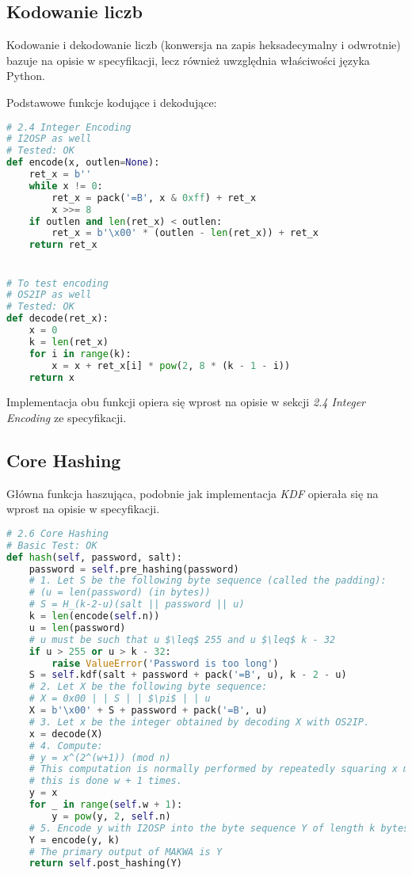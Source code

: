 \documentclass[a4paper,titleauthor]{mwart}
\begin{document}
\subsection{Kodowanie liczb}
Kodowanie i dekodowanie liczb (konwersja na zapis heksadecymalny i odwrotnie) bazuje na opisie w specyfikacji, lecz również uwzględnia właściwości języka Python.

Podstawowe funkcje kodujące i dekodujące:
\begin{lstlisting}[language=Python]
# 2.4 Integer Encoding
# I2OSP as well
# Tested: OK
def encode(x, outlen=None):
	ret_x = b''
	while x != 0:
		ret_x = pack('=B', x & 0xff) + ret_x
		x >>= 8
	if outlen and len(ret_x) < outlen:
		ret_x = b'\x00' * (outlen - len(ret_x)) + ret_x
	return ret_x


# To test encoding
# OS2IP as well
# Tested: OK
def decode(ret_x):
	x = 0
	k = len(ret_x)
	for i in range(k):
		x = x + ret_x[i] * pow(2, 8 * (k - 1 - i))
	return x
\end{lstlisting}
Implementacja obu funkcji opiera się wprost na opisie w sekcji \textit{2.4 Integer Encoding} ze specyfikacji.
\subsection{Core Hashing}
Główna funkcja haszująca, podobnie jak implementacja \textit{KDF} opierała się na wprost na opisie w specyfikacji.
\begin{lstlisting}[language=Python,mathescape]
# 2.6 Core Hashing
# Basic Test: OK
def hash(self, password, salt):
	password = self.pre_hashing(password)
	# 1. Let S be the following byte sequence (called the padding):
	# (u = len(password) (in bytes))
	# S = H_(k-2-u)(salt || password || u)
	k = len(encode(self.n))
	u = len(password)
	# u must be such that u $\leq$ 255 and u $\leq$ k - 32
	if u > 255 or u > k - 32:
		raise ValueError('Password is too long')
	S = self.kdf(salt + password + pack('=B', u), k - 2 - u)
	# 2. Let X be the following byte sequence:
	# X = 0x00 | | S | | $\pi$ | | u
	X = b'\x00' + S + password + pack('=B', u)
	# 3. Let x be the integer obtained by decoding X with OS2IP.
	x = decode(X)
	# 4. Compute:
	# y = x^(2^(w+1)) (mod n)
	# This computation is normally performed by repeatedly squaring x modulo n;
	# this is done w + 1 times.
	y = x
	for _ in range(self.w + 1):
		y = pow(y, 2, self.n)
	# 5. Encode y with I2OSP into the byte sequence Y of length k bytes.
	Y = encode(y, k)
	# The primary output of MAKWA is Y
	return self.post_hashing(Y)
\end{lstlisting}
\end{document}
